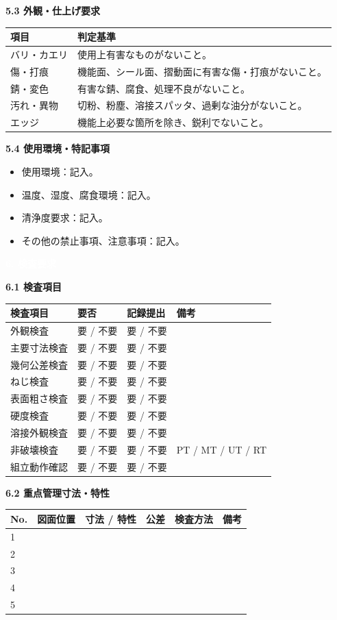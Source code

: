 \documentclass[a4paper,10pt]{ltjsarticle}
\makeatletter
\newlength{\SpecBodyWidth}
\newcommand{\PageTitle}[1]{%
  \vspace*{2mm}%
  \noindent\colorbox{SpecHead}{%
    \parbox{\dimexpr\SpecBodyWidth-2\fboxsep\relax}{%
      \large\bfseries\textcolor{white}{#1}%
    }%
  }%
  \par\vspace{5mm}%
}
\newcommand{\BlockTitle}[1]{%
  \vspace{4mm}%
  \noindent\colorbox{SpecSoft}{%
    \parbox{\dimexpr\SpecBodyWidth-2\fboxsep\relax}{%
      \normalsize\bfseries\textcolor{SpecHead}{#1}%
    }%
  }%
  \par\vspace{1.5mm}%
}
\newcommand{\Note}[1]{%
  \vspace{1.5mm}%
  \noindent\fbox{%
    \parbox{\dimexpr\SpecBodyWidth-2\fboxsep-2\fboxrule\relax}{%
      \footnotesize\textcolor{SpecMuted}{#1}%
    }%
  }%
  \par\vspace{1.5mm}%
}
\newenvironment{SpecTable}[1]{%
  \par\vspace{1mm}%
  \noindent\footnotesize%
  \renewcommand{\arraystretch}{1.10}%
  \setlength{\tabcolsep}{3.0pt}%
  \begin{tabular*}{\SpecBodyWidth}{@{\extracolsep{\fill}}#1@{}}%
}{%
  \end{tabular*}%
  \par\vspace{1.5mm}%
}
\newcommand{\Head}[1]{\textbf{\textcolor{SpecHead}{#1}}}
\newcommand{\YN}{要 / 不要}
\makeatother
\begin{document}
\BlockTitle{5.3 外観・仕上げ要求}
\begin{SpecTable}{|p{34mm}|p{112mm}|}
\hline
\Head{項目} & \Head{判定基準} \\
\hline
バリ・カエリ & 使用上有害なものがないこと。 \\
\hline
傷・打痕 & 機能面、シール面、摺動面に有害な傷・打痕がないこと。 \\
\hline
錆・変色 & 有害な錆、腐食、処理不良がないこと。 \\
\hline
汚れ・異物 & 切粉、粉塵、溶接スパッタ、過剰な油分がないこと。 \\
\hline
エッジ & 機能上必要な箇所を除き、鋭利でないこと。 \\
\hline
\end{SpecTable}

\BlockTitle{5.4 使用環境・特記事項}
\begin{itemize}
  \item 使用環境：記入。
  \item 温度、湿度、腐食環境：記入。
  \item 清浄度要求：記入。
  \item その他の禁止事項、注意事項：記入。
\end{itemize}

\clearpage

\PageTitle{6. 検査要求}

\BlockTitle{6.1 検査項目}
\begin{SpecTable}{|p{48mm}|p{22mm}|p{24mm}|p{52mm}|}
\hline
\Head{検査項目} & \Head{要否} & \Head{記録提出} & \Head{備考} \\
\hline
外観検査 & \YN & \YN &  \\
\hline
主要寸法検査 & \YN & \YN &  \\
\hline
幾何公差検査 & \YN & \YN &  \\
\hline
ねじ検査 & \YN & \YN &  \\
\hline
表面粗さ検査 & \YN & \YN &  \\
\hline
硬度検査 & \YN & \YN &  \\
\hline
溶接外観検査 & \YN & \YN &  \\
\hline
非破壊検査 & \YN & \YN & PT / MT / UT / RT \\
\hline
組立動作確認 & \YN & \YN &  \\
\hline
\end{SpecTable}

\BlockTitle{6.2 重点管理寸法・特性}
\begin{SpecTable}{|p{8mm}|p{22mm}|p{44mm}|p{20mm}|p{28mm}|p{24mm}|}
\hline
\Head{No.} & \Head{図面位置} & \Head{寸法 / 特性} & \Head{公差} & \Head{検査方法} & \Head{備考} \\
\hline
1 &  &  &  &  &  \\
\hline
2 &  &  &  &  &  \\
\hline
3 &  &  &  &  &  \\
\hline
4 &  &  &  &  &  \\
\hline
5 &  &  &  &  &  \\
\hline
\end{SpecTable}
\Note{検査成績書が必要な場合は、測定値、使用測定器、検査日、検査者を記録すること。}
\end{document}
